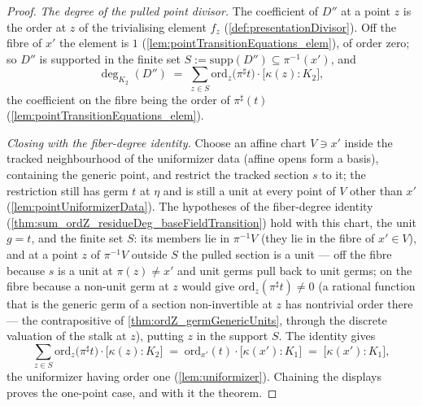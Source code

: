 \begin{proof}
  \emph{The degree of the pulled point divisor.} The coefficient of \(D''\) at a point
  \(z\) is the order at \(z\) of the trivialising element \(f_z\)
  (\ref{def:presentationDivisor}). Off the fibre of \(x'\) the element is \(1\)
  (\ref{lem:pointTransitionEquations_elem}), of order zero; so \(D''\) is supported in
  the finite set \(S := \mathrm{supp}(D'') \subseteq \pi^{-1}(x')\), and
  \[
    \deg_{K_2}(D'') \;=\; \sum_{z \in S}
      \mathrm{ord}_z\bigl(\pi^{\sharp}t\bigr) \cdot \bigl[\kappa(z) : K_2\bigr],
  \]
  the coefficient on the fibre being the order of \(\pi^{\sharp}(t)\)
  (\ref{lem:pointTransitionEquations_elem}).

  \emph{Closing with the fiber-degree identity.} Choose an affine chart
  \(V \ni x'\) inside the tracked neighbourhood of the uniformizer data (affine opens
  form a basis), containing the generic point, and restrict the tracked section
  \(s\) to it; the restriction still has germ \(t\) at \(\eta\) and is still a unit at
  every point of \(V\) other than \(x'\) (\ref{lem:pointUniformizerData}). The
  hypotheses of the fiber-degree identity
  (\ref{thm:sum_ordZ_residueDeg_baseFieldTransition}) hold with this chart, the unit
  \(g = t\), and the finite set \(S\): its members lie in
  \(\pi^{-1}V\) (they lie in the fibre of \(x' \in V\)), and at a point \(z\) of
  \(\pi^{-1}V\) outside \(S\) the pulled section is a unit --- off the fibre because
  \(s\) is a unit at \(\pi(z) \neq x'\) and unit germs pull back to unit germs; on the
  fibre because a non-unit germ at \(z\) would give
  \(\mathrm{ord}_z(\pi^{\sharp}t) \neq 0\) (a rational function that is the generic
  germ of a section non-invertible at \(z\) has nontrivial order there --- the
  contrapositive of \ref{thm:ordZ_germGenericUnits}, through the discrete valuation of
  the stalk at \(z\)), putting \(z\) in the support \(S\). The identity gives
  \[
    \sum_{z \in S} \mathrm{ord}_z\bigl(\pi^{\sharp}t\bigr) \cdot
      \bigl[\kappa(z) : K_2\bigr]
    \;=\; \mathrm{ord}_{x'}(t) \cdot \bigl[\kappa(x') : K_1\bigr]
    \;=\; \bigl[\kappa(x') : K_1\bigr],
  \]
  the uniformizer having order one (\ref{lem:uniformizer}). Chaining the displays
  proves the one-point case, and with it the theorem.
\end{proof}

